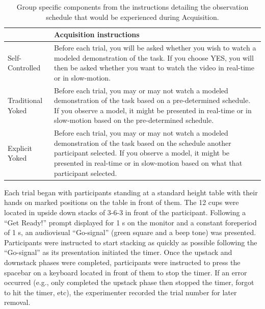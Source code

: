 \documentclass[
  english,
  man,floatsintext]{apa7}
\begin{document}
\begin{table}

\caption{\label{tab:table1}Group specific components from the instructions detailing the observation schedule that would be experienced during Acquisition.}
\fontsize{11}{13}\selectfont
\begin{tabular}[t]{>{\raggedright\arraybackslash}p{8em}>{\raggedright\arraybackslash}p{33em}}
\toprule
  & Acquisition instructions\\
\midrule
Self-Controlled & Before each trial, you will be asked whether you wish to watch a modeled demonstration of the task. If you choose YES, you will then be asked whether you want to watch the video in real-time or in slow-motion.\\
\addlinespace
Traditional Yoked & Before each trial, you may or may not watch a modeled demonstration of the task based on a pre-determined schedule. If you observe a model, it might be presented in real-time or in slow-motion based on the pre-determined schedule.\\
\addlinespace
Explicit Yoked & Before each trial, you may or may not watch a modeled demonstration of the task based on the schedule another participant selected. If you observe a model, it might be presented in real-time or in slow-motion based on what that participant selected.\\
\bottomrule
\end{tabular}
\end{table}

Each trial began with participants standing at a standard height table with their hands on marked positions on the table in front of them. The 12 cups were located in upside down stacks of 3-6-3 in front of the participant. Following a ``Get Ready!'' prompt displayed for 1 s on the monitor and a constant foreperiod of 1 s, an audiovisual ``Go-signal'' (green square and a beep tone) was presented. Participants were instructed to start stacking as quickly as possible following the ``Go-signal'' as its presentation initiated the timer. Once the upstack and downstack phases were completed, participants were instructed to press the spacebar on a keyboard located in front of them to stop the timer. If an error occurred (e.g., only completed the upstack phase then stopped the timer, forgot to hit the timer, etc), the experimenter recorded the trial number for later removal.
\end{document}
